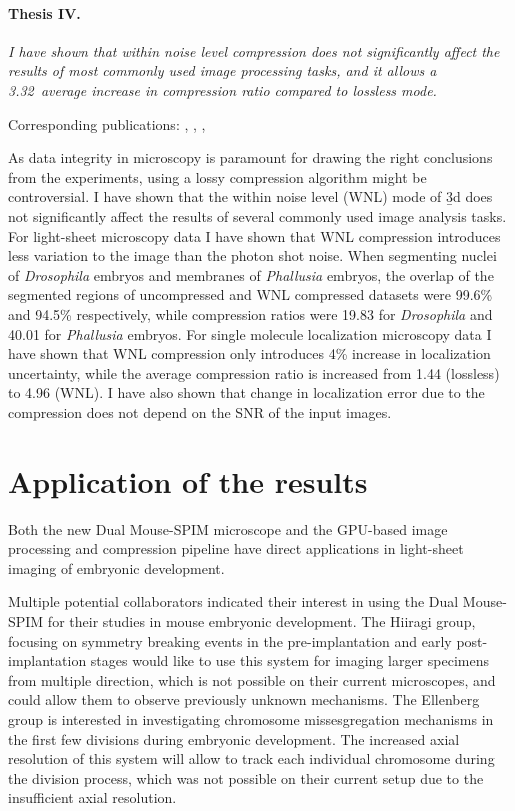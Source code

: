   \paragraph{Thesis IV.} \textit{I have shown that within noise level compression does not significantly affect the results of most commonly used image processing tasks, and it allows a 3.32\texttimes\ average increase in compression ratio compared to lossless mode.}
  
    Corresponding publications: \cite{balazs_real-time_2017}, \cite{balazs_gpu-based_2016}, \cite{balazs_gpu-based_2016-1}, \cite{balazs_gpu-based_2017}
    
    As data integrity in microscopy is paramount for drawing the right conclusions from the experiments, using a lossy compression algorithm might be controversial.
    I have shown that the within noise level (WNL) mode of \b3d does not significantly affect the results of several commonly used image analysis tasks. For light-sheet microscopy data I have shown that WNL compression introduces less variation to the image than the photon shot noise. When segmenting nuclei of \textit{Drosophila} embryos and membranes of \textit{Phallusia} embryos, the overlap of the segmented regions of uncompressed and WNL compressed datasets were 99.6\% and 94.5\% respectively, while compression ratios were 19.83 for \textit{Drosophila} and 40.01 for \textit{Phallusia} embryos. For single molecule localization microscopy data I have shown that WNL compression only introduces 4\% increase in localization uncertainty, while the average compression ratio is increased from 1.44 (lossless) to 4.96 (WNL). I have also shown that change in localization error due to the compression does not depend on the SNR of the input images.
    


\section{Application of the results}
  Both the new Dual Mouse-SPIM microscope and the GPU-based image processing and compression pipeline have direct applications in light-sheet imaging of embryonic development.

  Multiple potential collaborators indicated their interest in using the Dual Mouse-SPIM for their studies in mouse embryonic development. The Hiiragi group, focusing on symmetry breaking events in the pre-implantation and early post-implantation stages would like to use this system for imaging larger specimens from multiple direction, which is not possible on their current microscopes, and could allow them to observe previously unknown mechanisms. The Ellenberg group is interested in investigating chromosome missesgregation mechanisms in the first few divisions during embryonic development. The increased axial resolution of this system will allow to track each individual chromosome during the division process, which was not possible on their current setup due to the insufficient axial resolution.

